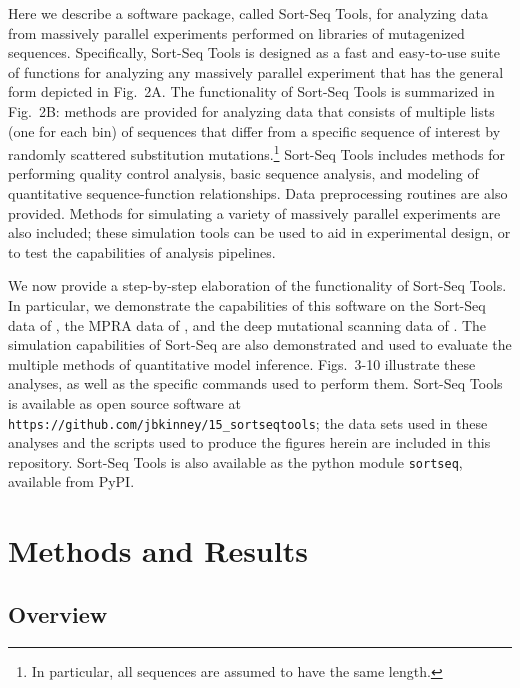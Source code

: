 \documentclass{bmcart}
\begin{document}
Here we describe a software package, called Sort-Seq Tools, for analyzing data from massively parallel experiments performed on libraries of  mutagenized sequences. Specifically, Sort-Seq Tools is designed as a fast and easy-to-use suite of functions for analyzing any massively parallel experiment that has the general form depicted in Fig.\ 2A. The functionality of Sort-Seq Tools is summarized in Fig.\ 2B: methods are provided for analyzing data that consists of multiple lists (one for each bin) of sequences that differ from a specific sequence of interest by randomly scattered substitution mutations.\footnote{In particular, all sequences are assumed to have the same length.} Sort-Seq Tools includes methods for performing quality control analysis, basic sequence analysis, and modeling of quantitative sequence-function relationships. Data preprocessing routines are also provided. Methods for simulating a variety of massively parallel experiments are also included; these simulation tools can be used to aid in experimental design, or to test the capabilities of analysis pipelines. 

We now provide a step-by-step elaboration of the functionality of Sort-Seq Tools. In particular, we demonstrate the capabilities of this software on the Sort-Seq data of \cite{Kinney:2010tn}, the MPRA data of \cite{Melnikov:2012dw}, and the deep mutational scanning data of \cite{Fowler:2010gt}. The simulation capabilities of Sort-Seq are also demonstrated and used to evaluate the multiple methods of quantitative model inference. Figs.\ 3-10 illustrate these analyses, as well as the specific commands used to perform them. Sort-Seq Tools is available as open source software at \texttt{https://github.com/jbkinney/15\_sortseqtools}; the data sets used in these analyses and the scripts used to produce the figures herein are included in this repository. Sort-Seq Tools is also available as the python module \texttt{sortseq}, available from PyPI.

\section*{Methods and Results}

%
%
\subsection*{Overview}
\end{document}
